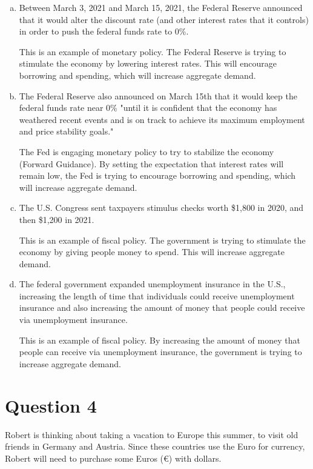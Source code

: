\documentclass{article}
\newcommand{\question}[1]{\pagebreak\section{Question #1}}
\begin{document}
\begin{enumerate}[(a)]
    \item Between March 3, 2021 and March 15, 2021, the Federal Reserve announced that it would alter the discount rate (and other interest rates that it controls) in order to push the federal funds rate to 0\%.
    
    This is an example of monetary policy. The Federal Reserve is trying to stimulate the economy by lowering interest rates. This will encourage borrowing and spending, which will increase aggregate demand.

    \item The Federal Reserve also announced on March 15th that it would keep the federal funds rate near 0\% "until it is confident that the economy has weathered recent events and is on track to achieve its maximum employment and price stability goals."
    
    The Fed is engaging monetary policy to try to stabilize the economy (Forward Guidance). By setting the expectation that interest rates will remain low, the Fed is trying to encourage borrowing and spending, which will increase aggregate demand.

    \item The U.S. Congress sent taxpayers stimulus checks worth \$1,800 in 2020, and then \$1,200 in 2021.
    
    This is an example of fiscal policy. The government is trying to stimulate the economy by giving people money to spend. This will increase aggregate demand.

    \item The federal government expanded unemployment insurance in the U.S., increasing the length of time that individuals could receive unemployment insurance and also increasing the amount of money that people could receive via unemployment insurance.
    
    This is an example of fiscal policy. By increasing the amount of money that people can receive via unemployment insurance, the government is trying to increase aggregate demand.
\end{enumerate}

\pagebreak

\question{4}

Robert is thinking about taking a vacation to Europe this summer, to
visit old friends in Germany and Austria. Since these countries use
the Euro for currency, Robert will need to purchase some Euros (€)
with dollars.
\end{document}
